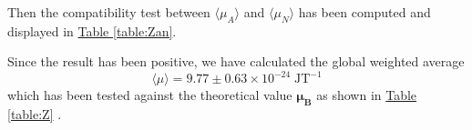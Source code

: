 \documentclass[a4paper,12pt,abstracton]{scrartcl}
\begin{document}
Then the compatibility test between $\langle \mu_A \rangle$ and $\langle \mu_N \rangle$ has been computed and displayed in \hyperref[table:Zan]{Table \ref*{table:Zan}}. 
\begin{table}[H]
\caption{}
\centering
{}
\label{table:Zan}
\end{table}

Since the result has been positive, we have calculated the global weighted average $$ \langle \mu\rangle=9.77 \pm  0.63\times 10^{-24}\;\text{JT}^{-1}$$ which has been tested against the theoretical value $\boldsymbol{\mu_B}$ as shown in \hyperref[table:Z]{Table \ref*{table:Z}} .

\begin{table}[H]
\caption{}
\centering
{}
\label{table:Z}
\end{table}
\end{document}
